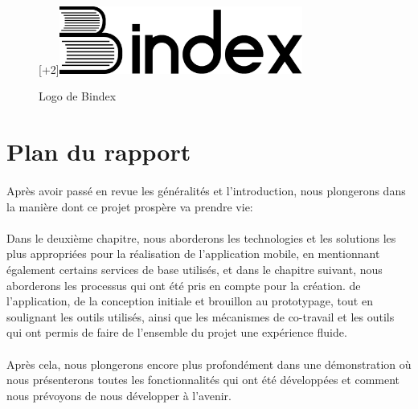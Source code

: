 \begin{figure}[h]
	\begin{center}
		\raisebox{0pt}[\dimexpr\height+2\baselineskip\relax]{\includegraphics[width=8cm]{Images/chapter1/bindexLogo.png}}
		\caption{Logo de Bindex}
	\end{center}
\end{figure}

\section{Plan du rapport}
\paragraph*{}
Après avoir passé en revue les généralités et l’introduction, nous plongerons dans la manière dont ce projet prospère va prendre vie:
\paragraph*{}
Dans le deuxième chapitre, nous aborderons les technologies et les solutions les plus appropriées pour la réalisation de l’application mobile, en mentionnant également certains services de base utilisés, et dans le chapitre suivant, nous aborderons les processus qui ont été pris en compte pour la création. de l’application, de la conception initiale et brouillon au prototypage, tout en soulignant les outils utilisés, ainsi que les mécanismes de co-travail et les outils qui ont permis de faire de l’ensemble du projet une expérience fluide.
\paragraph*{}
Après cela, nous plongerons encore plus profondément dans une démonstration où nous présenterons toutes les fonctionnalités qui ont été développées et comment nous prévoyons de nous développer à l’avenir.

